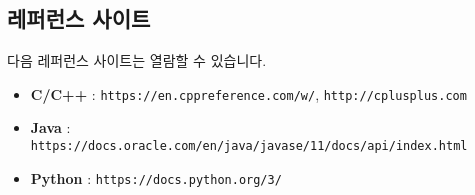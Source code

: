 \subsection*{레퍼런스 사이트}
다음 레퍼런스 사이트는 열람할 수 있습니다.
\begin{itemize}
    \item \textbf{C/C++} : \verb|https://en.cppreference.com/w/|, \verb|http://cplusplus.com|
    \item \textbf{Java} : \verb|https://docs.oracle.com/en/java/javase/11/docs/api/index.html|
    \item \textbf{Python} : \verb|https://docs.python.org/3/|    
\end{itemize}
